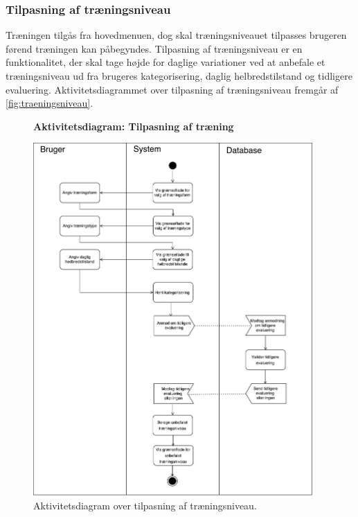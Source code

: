 \subsubsection*{Tilpasning af træningsniveau} \label{sec:traeningsniveau}
Træningen tilgås fra hovedmenuen, dog skal træningsniveauet tilpasses brugeren førend træningen kan påbegyndes. Tilpasning af træningsniveau er en funktionalitet, der skal tage højde for daglige variationer ved at anbefale et træningsniveau ud fra brugeres kategorisering, daglig helbredstilstand og tidligere evaluering.  
Aktivitetsdiagrammet over tilpasning af træningsniveau fremgår af \autoref{fig:traeningsniveau}.

\begin{figure} [H]
\centering
\textbf{Aktivitetsdiagram: Tilpasning af træning}\par\medskip
\includegraphics[width=0.95\textwidth]{figures/aktivitetsdiagram/Tilpasningaftraeningsniveau}
\caption{Aktivitetsdiagram over tilpasning af træningsniveau.}
\label{fig:traeningsniveau}
\end{figure}

